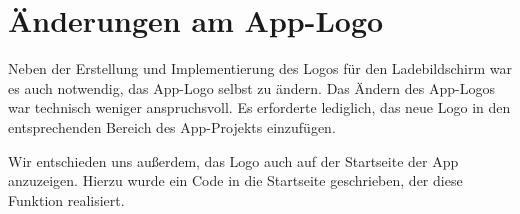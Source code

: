 \section{Änderungen am App-Logo}

Neben der Erstellung und Implementierung des Logos für den Ladebildschirm war es auch notwendig, das App-Logo selbst zu ändern. Das Ändern des App-Logos war technisch weniger anspruchsvoll. Es erforderte lediglich, das neue Logo in den entsprechenden Bereich des App-Projekts einzufügen.

Wir entschieden uns außerdem, das Logo auch auf der Startseite der App anzuzeigen. Hierzu wurde ein Code in die Startseite geschrieben, der diese Funktion realisiert.
